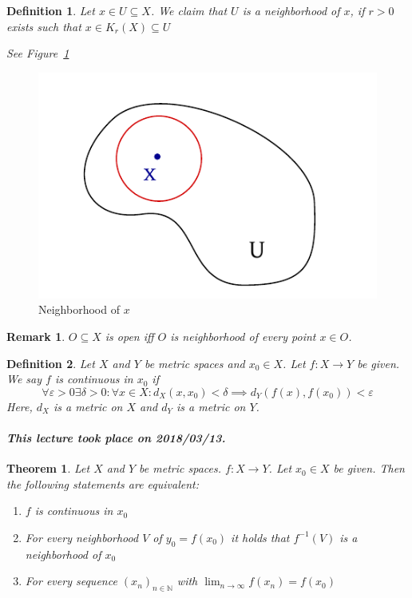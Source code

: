 \documentclass{article}
\newtheorem{theorem}{Theorem}  \numberwithin{theorem}{section}
\newtheorem{definition}{Definition}  \numberwithin{definition}{section}
\newtheorem{remark}{Remark}  \numberwithin{remark}{section}
\newcommand{\dateref}[1]{\paragraph{\textit{This lecture took place on #1.}}}
\begin{document}
\begin{definition}
  Let $x \in U \subseteq X$. We claim that $U$ is a neighborhood of $x$,
  if $r > 0$ exists such that $x \in K_r(X) \subseteq U$

  See Figure~\ref{img:neigh}
\end{definition}

\begin{figure}
  \begin{center}
    \includegraphics{img/06_neighborhood.pdf}
    \caption{Neighborhood of $x$}
    \label{img:neigh}
  \end{center}
\end{figure}

\begin{remark}
  $O \subseteq X$ is open iff $O$ is neighborhood of every point $x \in O$.
\end{remark}

\begin{definition}
  Let $X$ and $Y$ be metric spaces and $x_0 \in X$.
  Let $f: X \to Y$ be given. We say $f$ is continuous in $x_0$ if
  \[ \forall \varepsilon > 0 \exists \delta > 0: \forall x \in X: d_X(x, x_0) < \delta \implies d_Y(f(x), f(x_0)) < \varepsilon \]
  Here, $d_X$ is a metric on $X$ and $d_Y$ is a metric on $Y$.
\end{definition}

\dateref{2018/03/13}

\begin{theorem} %
  \label{satz3t}
  Let $X$ and $Y$ be metric spaces. $f: X \to Y$. Let $x_0 \in X$ be given.
  Then the following statements are equivalent:
  \begin{enumerate}
    \item $f$ is continuous in $x_0$
    \item For every neighborhood $V$ of $y_0 = f(x_0)$ it holds that $f^{-1}(V)$ is a neighborhood of $x_0$
    \item For every sequence $(x_n)_{n \in \mathbb N}$ with $\lim_{n\to\infty} f(x_n) = f(x_0)$
  \end{enumerate}
\end{theorem}
\end{document}
